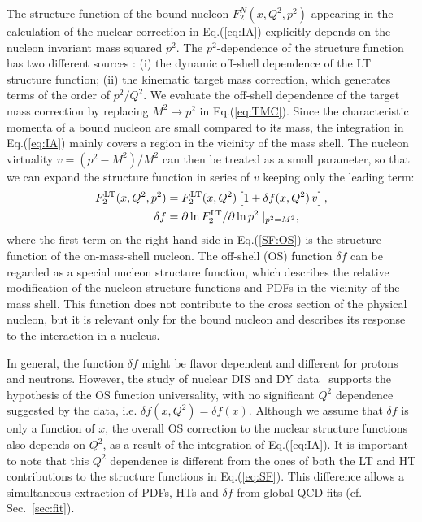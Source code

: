 \documentclass[%
      aps,
      prd,
      floatfix,
      preprintnumbers,
      preprint,
      showpacs,
      nofootinbib,
      tightenlines,
      amssymb,
      amsmath
]{revtex4-1}
\newcommand{\ceps}{\varepsilon}
\newcommand{\eq}[1]{Eq.(\ref{#1})}
\begin{document}
The structure function of the bound nucleon $F_2^N(x,Q^2,p^2)$ appearing in the calculation of 
the nuclear correction in \eq{eq:IA} explicitly depends on the nucleon invariant 
mass squared $p^2$. %
The $p^2$-dependence of the structure function has two different sources \cite{Kulagin:1994fz,KP04}:
(i) the dynamic off-shell dependence of the LT structure function; 
(ii) the kinematic target mass correction, which generates terms of the order of $p^2/Q^2$. 
We evaluate the off-shell dependence of the target mass correction by
replacing $M^2\to p^2$ in \eq{eq:TMC}.
%
Since the characteristic momenta of a bound nucleon are small compared to its mass,
the integration in \eq{eq:IA} mainly covers a region in the vicinity of the mass shell. 
The nucleon virtuality $v=(p^2-M^2)/M^2$ can then be treated as a small parameter, so that we  
can expand the structure function in series of $v$ keeping only the leading term:
%
\begin{align}
\label{SF:OS}
F_2^{\rm LT}(x,Q^2,p^2) &=
F_2^{\rm LT}(x,Q^2)\left[ 1+\delta f(x,Q^2)\,v \right],\\
\label{delf}
\delta f &= \partial\ln F_2^{\rm LT}/\partial\ln p^2\mid_{p^2=M^2},
\end{align}
%
where the first term on the right-hand side in \eq{SF:OS} is the structure
function of the on-mass-shell nucleon.
%
The off-shell (OS) function $\delta f$ can be regarded as a special nucleon structure function,
which describes the relative  
modification of the nucleon structure functions and PDFs in the vicinity of the mass shell.
This function does not contribute to the cross section of the
physical nucleon, but it is relevant only for the bound nucleon and describes its
response to the interaction in a nucleus.
  
In general, the function $\delta f$ might be flavor dependent and different
for protons and neutrons.
However, the study of nuclear DIS and DY data~\cite{KP04,KP10,KP14} 
supports the hypothesis of the OS function universality, 
with no significant $Q^2$ dependence suggested by the data, i.e. $\delta f(x,Q^2)=\delta f(x)$. 
Although we assume that $\delta f$ is only a function of $x$, the overall OS correction to the nuclear structure 
functions also depends on $Q^2$, as a result of the integration of \eq{eq:IA}.
It is important to note that this $Q^2$ dependence is different from the ones of both 
the LT and HT contributions to the structure functions in \eq{eq:SF}. 
This difference allows a simultaneous extraction of PDFs, HTs and $\delta f$ from 
global QCD fits (cf. Sec.~\ref{sec:fit}). 
\end{document}
